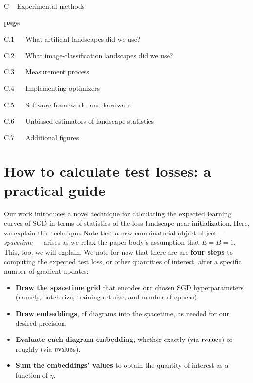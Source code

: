 \documentclass{article}
\theoremstyle{plain}
\theoremstyle{definition}
\newcommand{\uvalue}{\text{\textnormal{uvalue}}}
\newcommand{\rvalue}{\text{\textnormal{rvalue}}}
\begin{document}
    {\bf
    \par\noindent C ~ Experimental methods}                                 \hfill {\bf page \pageref{appendix:experiments}}
    \par\indent     C.1 ~~ What artificial landscapes did we use?           \hfill \pageref{appendix:artificial}  
    \par\indent     C.2 ~~ What image-classification landscapes did we use? \hfill \pageref{appendix:natural}
    \par\indent     C.3 ~~ Measurement process                              \hfill \pageref{appendix:measure}
    \par\indent     C.4 ~~ Implementing optimizers                          \hfill \pageref{appendix:optimizers}
    \par\indent     C.5 ~~ Software frameworks and hardware                 \hfill \pageref{appendix:frameworks}
    \par\indent     C.6 ~~ Unbiased estimators of landscape statistics      \hfill \pageref{appendix:bessel}
    \par\indent     C.7 ~~ Additional figures                               \hfill \pageref{appendix:figures}
    


\newpage
\section{How to calculate test losses: a practical guide}\label{appendix:tutorial}
    Our work introduces a novel technique for calculating the expected learning
    curves of SGD in terms of statistics of the loss landscape near
    initialization.  Here, we explain this technique.  Note that a new
    combinatorial object object --- \emph{spacetime} --- arises as we relax the
    paper body's assumption that $E=B=1$.  This, too, we will explain.  We note
    for now that there are are {\bf four steps} to computing the expected test
    loss, or other quantities of interest, after a specific number of gradient
    updates: 
    \begin{itemize}
        \item {\bf Draw the spacetime grid} that encodes our chosen SGD
            hyperparameters (namely, batch size, training set size, and number
            of epochs).
        \item {\bf Draw embeddings}, of diagrams into the
            spacetime, as needed for our desired precision.
        \item {\bf Evaluate each diagram embedding}, whether exactly
            (via $\rvalue$s) or roughly (via $\uvalue$s).
        \item {\bf Sum the embeddings' values} to obtain the quantity of
              interest as a function of $\eta$.
    \end{itemize}
\end{document}
